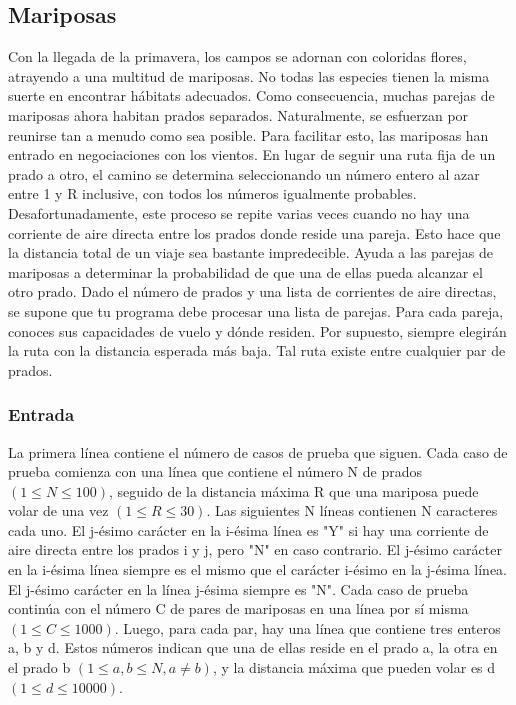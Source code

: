 \newpage
\subsection*{Mariposas}

Con la llegada de la primavera, los campos se adornan con coloridas flores, atrayendo a
una multitud de mariposas. No todas las especies tienen la misma suerte en encontrar
hábitats adecuados. Como consecuencia, muchas parejas de mariposas ahora habitan prados
separados. Naturalmente, se esfuerzan por reunirse tan a menudo como sea posible. Para
facilitar esto, las mariposas han entrado en negociaciones con los vientos. En lugar de
seguir una ruta fija de un prado a otro, el camino se determina seleccionando un número
entero al azar entre 1 y R inclusive, con todos los números igualmente probables.
Desafortunadamente, este proceso se repite varias veces cuando no hay una corriente de
aire directa entre los prados donde reside una pareja. Esto hace que la distancia total de
un viaje sea bastante impredecible. Ayuda a las parejas de mariposas a determinar la
probabilidad de que una de ellas pueda alcanzar el otro prado. Dado el número de prados y
una lista de corrientes de aire directas, se supone que tu programa debe procesar una
lista de parejas. Para cada pareja, conoces sus capacidades de vuelo y dónde residen. Por
supuesto, siempre elegirán la ruta con la distancia esperada más baja. Tal ruta existe
entre cualquier par de prados.

\subsubsection*{Entrada}

La primera línea contiene el número de casos de prueba que siguen. Cada caso de prueba
comienza con una línea que contiene el número N de prados $(1 \leq N \leq 100)$, seguido de la
distancia máxima R que una mariposa puede volar de una vez $(1 \leq R \leq 30)$. Las siguientes N
líneas contienen N caracteres cada uno. El j-ésimo carácter en la i-ésima línea es "Y" si
hay una corriente de aire directa entre los prados i y j, pero "N" en caso contrario. El
j-ésimo carácter en la i-ésima línea siempre es el mismo que el carácter i-ésimo en la
j-ésima línea. El j-ésimo carácter en la línea j-ésima siempre es "N". Cada caso de prueba
continúa con el número C de pares de mariposas en una línea por sí misma $(1 \leq C \leq 1000)$.
Luego, para cada par, hay una línea que contiene tres enteros a, b y d. Estos números
indican que una de ellas reside en el prado a, la otra en el prado b $(1 \leq a, b \leq N, a \not =
b)$, y la distancia máxima que pueden volar es d $(1 \leq d \leq 10000)$.

